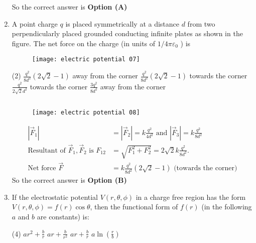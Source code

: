 \begin{enumerate}
\begin{answer}
		So the correct answer is \textbf{Option (A)}
	\end{answer}
	\item A point charge $q$ is placed symmetrically at a distance $d$ from two perpendicularly placed grounded conducting infinite plates as shown in the figure. The net force on the charge (in units of $1 / 4 \pi \varepsilon_{0}$ ) is
	{}
	\begin{figure}[H]
		\centering
		\texttt{[image: electric potential 07]}
	\end{figure}
	\begin{tasks}(2)
		\task[\textbf{A.}] $\frac{q^{2}}{8 d^{2}}(2 \sqrt{2}-1)$ away from the corner
		\task[\textbf{B.}] $\frac{q^{2}}{8 d^{2}}(2 \sqrt{2}-1)$ towards the corner
		\task[\textbf{C.}] $\frac{q^{2}}{2 \sqrt{2} d^{2}}$ towards the corner
		\task[\textbf{D.}] $\frac{3 q^{2}}{8 d^{2}}$ away from the corner
	\end{tasks}
	\begin{answer}$\left. \right. $
		\begin{figure}[H]
			\centering
			\texttt{[image: electric potential 08]}
		\end{figure}
		\begin{align*}
		\left|\vec{F}_{1}\right|&=\left|\vec{F}_{2}\right|=k \frac{q^{2}}{4 d^{2}} \text{ and } \left|\vec{F}_{3}\right|=k \frac{q^{2}}{8 d^{2}}\\
		\text{Resultant of }\vec{F}_{1}, \vec{F}_{2}\text{ is }F_{12}&=\sqrt{F_{1}^{2}+F_{2}^{2}}=2 \sqrt{2} k \frac{q^{2}}{8 d^{2}}.\\
		\text{Net force }\vec{F}&=k \frac{q^{2}}{8 d^{2}}(2 \sqrt{2}-1)\text{ (towards the corner)}
		\end{align*}
		So the correct answer is \textbf{Option (B)}
	\end{answer}
	\item If the electrostatic potential $V(r, \theta, \phi)$ in a charge free region has the form $V(r, \theta, \phi)=f(r) \cos \theta$, then the functional form of $f(r)$ (in the following $a$ and $b$ are constants) is:
	{}
	\begin{tasks}(4)
		\task[\textbf{A.}] $a r^{2}+\frac{b}{r}$
		\task[\textbf{B.}] $a r+\frac{b}{r^{2}}$
		\task[\textbf{C.}] $a r+\frac{b}{r}$
		\task[\textbf{D.}] $a \ln \left(\frac{r}{b}\right)$
	\end{tasks}
	\begin{answer}
		\begin{align*}

\end{align*}
\end{answer}
\end{enumerate}
